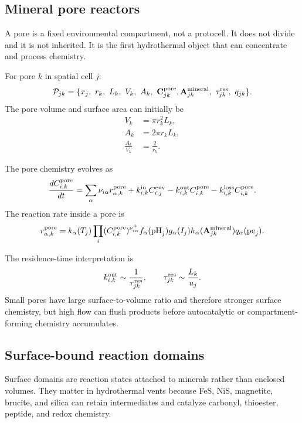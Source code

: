 \documentclass[11pt]{article}
\begin{document}
\subsection{Mineral pore reactors}

A pore is a fixed environmental compartment, not a protocell. It does not
divide and it is not inherited. It is the first hydrothermal object that can
concentrate and process chemistry.

For pore $k$ in spatial cell $j$:
\begin{equation}
\mathcal{P}_{jk}
=
\{
x_j,\ r_k,\ L_k,\ V_k,\ A_k,\ \mathbf{C}_{jk}^{\rm pore},
\mathbf{A}_{jk}^{\rm mineral},\ \tau_{jk}^{\rm res},\ q_{jk}
\}.
\end{equation}
The pore volume and surface area can initially be
\begin{align}
V_k &= \pi r_k^2 L_k,\\
A_k &= 2\pi r_k L_k,\\
\frac{A_k}{V_k} &= \frac{2}{r_k}.
\end{align}

The pore chemistry evolves as
\begin{equation}
\frac{dC_{i,k}^{\rm pore}}{dt}
=
\sum_\alpha \nu_{i\alpha} r_{\alpha,k}^{\rm pore}
+
k_{i,k}^{\rm in}C_{i,j}^{\rm env}
-
k_{i,k}^{\rm out}C_{i,k}^{\rm pore}
-
k_{i,k}^{\rm loss}C_{i,k}^{\rm pore}.
\end{equation}
The reaction rate inside a pore is
\begin{equation}
r_{\alpha,k}^{\rm pore}
=
k_{\alpha}(T_j)
\prod_i (C_{i,k}^{\rm pore})^{\nu_{i\alpha}^{+}}
f_\alpha(\mathrm{pH}_j)
g_\alpha(I_j)
h_\alpha(\mathbf{A}_{jk}^{\rm mineral})
q_\alpha(\mathrm{pe}_j).
\end{equation}

The residence-time interpretation is
\begin{equation}
k_{i,k}^{\rm out}\sim \frac{1}{\tau_{jk}^{\rm res}},
\qquad
\tau_{jk}^{\rm res}\sim \frac{L_k}{u_j}.
\end{equation}
Small pores have large surface-to-volume ratio and therefore stronger surface
chemistry, but high flow can flush products before autocatalytic or
compartment-forming chemistry accumulates.

\subsection{Surface-bound reaction domains}

Surface domains are reaction states attached to minerals rather than enclosed
volumes. They matter in hydrothermal vents because FeS, NiS, magnetite, brucite,
and silica can retain intermediates and catalyze carbonyl, thioester, peptide,
and redox chemistry.
\end{document}
